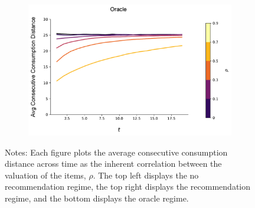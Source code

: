 \documentclass[format=acmsmall, review=true]{acmart}
\begin{document}
\begin{figure}[H]
\begin{subfigure}{.45\textwidth}
\end{subfigure}\\
\begin{subfigure}{.45\textwidth}
\includegraphics[width=\linewidth]{figures/rho_consumption_dist_N_100T_20_omni.pdf}\\
\end{subfigure}
\caption*{\scriptsize Notes: Each figure plots the average consecutive consumption distance across time as the inherent correlation between the valuation of the items, $\rho$. The top left displays the no recommendation regime, the top right displays the recommendation regime, and the bottom displays the oracle regime.}
\label{fig:local_consumption_across_rho}
\end{figure}

\addtocounter{figure}{-1}
\end{document}
